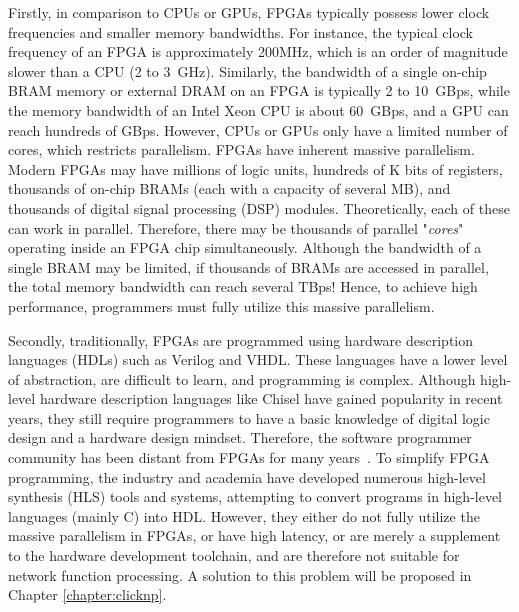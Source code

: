 Firstly, in comparison to CPUs or GPUs, FPGAs typically possess lower clock frequencies and smaller memory bandwidths. For instance, the typical clock frequency of an FPGA is approximately 200MHz, which is an order of magnitude slower than a CPU (2 to 3~GHz). Similarly, the bandwidth of a single on-chip BRAM memory or external DRAM on an FPGA is typically 2 to 10~GBps, while the memory bandwidth of an Intel Xeon CPU is about 60~GBps, and a GPU can reach hundreds of GBps. However, CPUs or GPUs only have a limited number of cores, which restricts parallelism. FPGAs have inherent massive parallelism. Modern FPGAs may have millions of logic units, hundreds of K bits of registers, thousands of on-chip BRAMs (each with a capacity of several MB), and thousands of digital signal processing (DSP) modules. Theoretically, each of these can work in parallel. Therefore, there may be thousands of parallel "\textit{cores}" operating inside an FPGA chip simultaneously. Although the bandwidth of a single BRAM may be limited, if thousands of BRAMs are accessed in parallel, the total memory bandwidth can reach several TBps! Hence, to achieve high performance, programmers must fully utilize this massive parallelism.

Secondly, traditionally, FPGAs are programmed using hardware description languages (HDLs) such as Verilog and VHDL. These languages have a lower level of abstraction, are difficult to learn, and programming is complex. Although high-level hardware description languages like Chisel \cite{bachrach2012chisel} have gained popularity in recent years, they still require programmers to have a basic knowledge of digital logic design and a hardware design mindset. Therefore, the software programmer community has been distant from FPGAs for many years~\cite {bacon2013fpga}. To simplify FPGA programming, the industry and academia have developed numerous high-level synthesis (HLS) tools and systems, attempting to convert programs in high-level languages (mainly C) into HDL. However, they either do not fully utilize the massive parallelism in FPGAs, or have high latency, or are merely a supplement to the hardware development toolchain, and are therefore not suitable for network function processing. A solution to this problem will be proposed in Chapter \ref{chapter:clicknp}.


